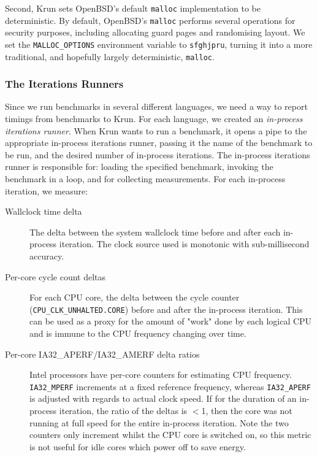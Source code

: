 \documentclass[preprint,numbers,10pt]{sigplanconf}
\newcommand{\krun}{Krun\xspace}
\begin{document}
Second, \krun sets OpenBSD's default \texttt{malloc} implementation to be
deterministic. By default, OpenBSD's \texttt{malloc} performs several operations
for security purposes, including allocating guard pages and randomising layout.
We set the \texttt{MALLOC\_OPTIONS} environment variable to \texttt{sfghjpru},
turning it into a more traditional, and hopefully largely deterministic,
\texttt{malloc}.


\subsubsection{The Iterations Runners}

Since we run benchmarks in several different languages, we need a way to report
timings from benchmarks to \krun. For each language, we created an
\emph{in-process iterations runner}. When \krun wants to run a benchmark, it opens a pipe to the
appropriate in-process iterations runner, passing it the name of the
benchmark to be run, and the desired number of in-process iterations. The
in-process iterations runner is responsible for: loading the specified
benchmark, invoking the benchmark in a loop, and for collecting measurements.
For each in-process iteration, we measure:

\begin{description}
\item[Wallclock time delta] The delta between the system wallclock time before
    and after each in-process iteration. The clock source used is monotonic
    with sub-millisecond accuracy.
\item[Per-core cycle count deltas] For each CPU core, the delta between the
    cycle counter (\texttt{CPU\_CLK\_UNHALTED.CORE}) before and after the
    in-process iteration. This can be used as a proxy for the amount of "work"
    done by each logical CPU and is immune to the CPU frequency changing over
    time.
\item[Per-core IA32\_APERF/IA32\_AMERF delta ratios] Intel processors have
    per-core counters for estimating CPU frequency. \texttt{IA32\_MPERF}
    increments at a fixed reference frequency, whereas \texttt{IA32\_APERF} is
    adjusted with regards to actual clock speed. If for the duration of an
    in-process iteration, the ratio of the deltas is $<$1, then the core was
    not running at full speed for the entire in-process iteration. Note the two
    counters only increment whilst the CPU core is switched on, so this metric
    is not useful for idle cores which power off to save energy.
\end{description}
\end{document}
